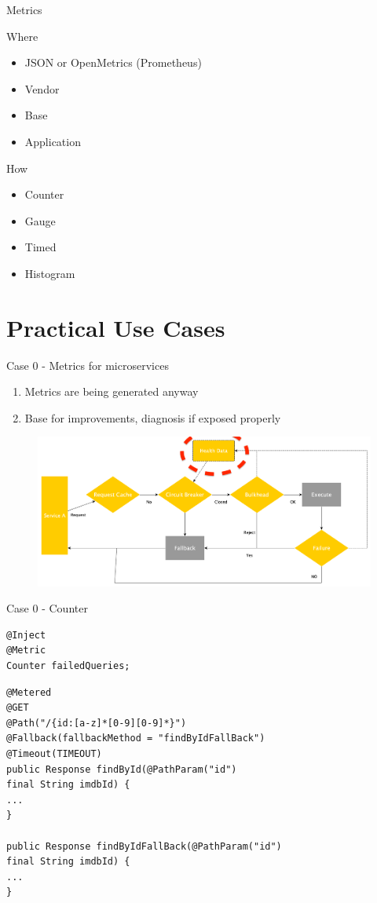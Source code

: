 \documentclass{beamer}
\begin{document}
\begin{frame}{Metrics}

Where
\begin{itemize}
	\item JSON or OpenMetrics (Prometheus)
	\item Vendor
	\item Base
	\item Application
\end{itemize}

How
\begin{itemize}
	\item Counter
	\item Gauge
	\item Timed
	\item Histogram
\end{itemize}

\end{frame}


\section{Practical Use Cases}


\begin{frame}{Case 0 - Metrics for microservices}

\begin{enumerate}
	\item Metrics are being generated anyway
	\item Base for improvements, diagnosis if exposed properly
\end{enumerate}

\begin{figure}
	\centering
	\includegraphics[width=\linewidth]{Images/falldata}
\end{figure}

\end{frame}

\begin{frame}[fragile]{Case 0 - Counter}
\begin{lstlisting}
@Inject
@Metric
Counter failedQueries;
\end{lstlisting}

\begin{lstlisting}
@Metered
@GET
@Path("/{id:[a-z]*[0-9][0-9]*}")
@Fallback(fallbackMethod = "findByIdFallBack")
@Timeout(TIMEOUT)
public Response findById(@PathParam("id") 
final String imdbId) {
...
}

public Response findByIdFallBack(@PathParam("id") 
final String imdbId) {
...
}
\end{lstlisting}
\end{frame}
\end{document}

